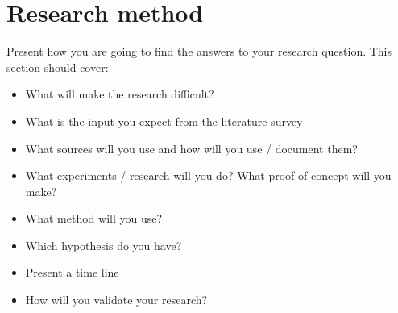 \section{Research method} 
Present how you are going to find the answers to your research question. This section should cover:
\begin{itemize}
    \item What will make the research difficult?
    \item What is the input you expect from the literature survey
    \item What sources will you use and how will you use / document them?
    \item What experiments / research will you do? What proof of concept will you make?
	\item What method will you use?
	\item Which hypothesis do you have?
    \item Present a time line
	\item How will you validate your research?
\end{itemize}